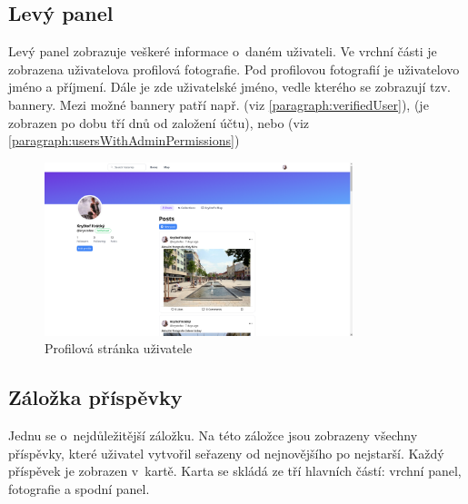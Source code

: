 \documentclass[12pt, a4paper,
  oneside,      %
]{report}
\begin{document}
\subsection{Levý panel}
Levý panel zobrazuje veškeré informace o~daném uživateli. Ve vrchní části je zobrazena uživatelova profilová fotografie. Pod profilovou fotografií je uživatelovo jméno a příjmení. Dále je zde uživatelské jméno, vedle kterého se zobrazují tzv. bannery. Mezi možné bannery patří např.  (viz \ref{paragraph:verifiedUser}),  (je zobrazen po dobu tří dnů od založení účtu), nebo  (viz \ref{paragraph:usersWithAdminPermissions})

\begin{figure}[h]
	\centering
	\includegraphics[width=0.8\textwidth]{images/user_page.png}
	\caption{Profilová stránka uživatele}\label{profilePageScreenshot}
\end{figure}

\subsection{Záložka příspěvky}
Jednu se o~nejdůležitější záložku. Na této záložce jsou zobrazeny všechny příspěvky, které uživatel vytvořil seřazeny od nejnovějšího po nejstarší. Každý příspěvek je zobrazen v~kartě. Karta se skládá ze tří hlavních částí: vrchní panel, fotografie a spodní panel. 
\end{document}
